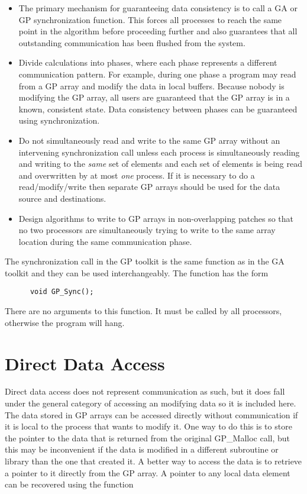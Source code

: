 \begin{itemize}

\item The primary mechanism for guaranteeing data consistency is to call a GA or
GP synchronization function. This forces all processes to reach the same point
in the algorithm before proceeding further and also guarantees that all
outstanding communication has been flushed from the system.

\item Divide calculations into phases, where each phase represents a different
communication pattern. For example, during one phase a program may read from a
GP array and modify the data in local buffers. Because nobody is modifying the
GP array, all users are guaranteed that the GP array is in a known, consistent
state. Data consistency between phases can be guaranteed using synchronization.

\item Do not simultaneously read and write to the same GP array without an
intervening synchronization call unless each process is simultaneously reading
and writing to the \emph{same} set of elements and each set of elements is being
read and overwritten by at most \emph{one} process. If it is necessary to do a
read/modify/write then separate GP arrays should be used for the data source and
destinations.

\item Design algorithms to write to GP arrays in non-overlapping patches so that
no two processors are simultaneously trying to write to the same array location
during the same communication phase.

\end{itemize}

The synchronization call in the GP toolkit is the same function as in the GA
toolkit and they can be used interchangeably. The function has the form

\begin{verbatim}
      void GP_Sync();
\end{verbatim}

\noindent
There are no arguments to this function. It must be called by all processors,
otherwise the program will hang.

\section{Direct Data Access}

Direct data access does not represent communication as such, but it does fall
under the general category of accessing an modifying data so it is included
here. The data stored in GP arrays can be accessed directly without
communication if it is local to the process that wants to modify it. One way to
do this is to store the pointer to the data that is returned from the original
GP\_Malloc call, but this may be inconvenient if the data is modified in a
different subroutine or library than the one that created it. A better way to
access the data is to retrieve a pointer to it directly from the GP array. A
pointer to any local data element can be recovered using the function

